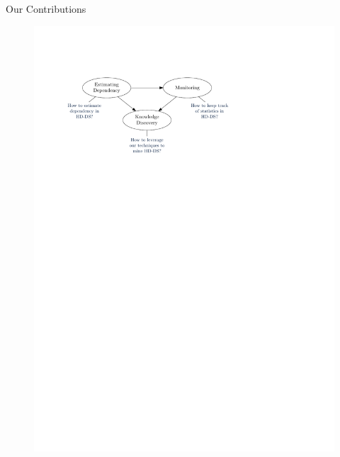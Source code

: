 \documentclass[16pt,usenames,dvipsnames, notheorems]{beamer}
\theoremstyle{definition}
\theoremstyle{example}
\theoremstyle{plain}
\begin{document}
\begin{frame}{Our Contributions}
\begin{figure}
\begin{overprint}
		 \includegraphics[width=1.0 \linewidth]{figures/outline_c_3-compressed.pdf}

\end{overprint}
\end{figure}
\end{frame}
\end{document}
